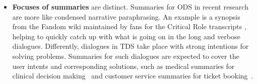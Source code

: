 \begin{itemize}
\item \textbf{Focuses of summaries} are distinct. Summaries for ODS in recent research are more like condensed narrative paraphrasing. An example is a synopsis from the Fandom wiki
maintained by fans for the Critical Role transcripts
\cite{rameshkumar2020storytelling}, helping to quickly catch up with what is going on in the long and verbose dialogues. Differently, dialogues in TDS take place with strong intentions for solving problems. Summaries for such dialogues are expected to cover the user intents and corresponding solutions, such as medical summaries for clinical decision making~\cite{joshi2020dr} and customer service summaries for ticket booking~\cite{zhao2021todsum}.%
\end{itemize}

